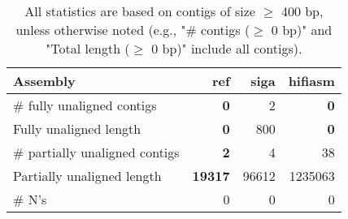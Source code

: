 \documentclass[12pt,a4paper]{article}
\begin{document}
\begin{table}[ht]
\begin{center}
\caption{All statistics are based on contigs of size $\geq$ 400 bp, unless otherwise noted (e.g., "\# contigs ($\geq$ 0 bp)" and "Total length ($\geq$ 0 bp)" include all contigs).}
\begin{tabular}{|l*{3}{|r}|}
\hline
Assembly & ref & siga & hifiasm \\ \hline
\# fully unaligned contigs & {\bf 0} & 2 & {\bf 0} \\ \hline
Fully unaligned length & {\bf 0} & 800 & {\bf 0} \\ \hline
\# partially unaligned contigs & {\bf 2} & 4 & 38 \\ \hline
Partially unaligned length & {\bf 19317} & 96612 & 1235063 \\ \hline
\# N's & 0 & 0 & 0 \\ \hline
\end{tabular}
\end{center}
\end{table}
\end{document}
